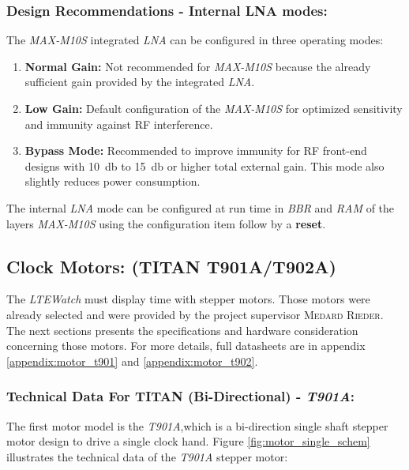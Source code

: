 \documentclass[report.tex]{subfiles}
\begin{document}
\subsubsection{Design Recommendations - Internal LNA modes:}

The \textit{MAX-M10S} integrated \textit{LNA} can be configured in three operating modes:
\begin{enumerate}
\item \textbf{Normal Gain:} Not recommended for \textit{MAX-M10S} because the already sufficient gain provided by the integrated \textit{LNA}.
\item \textbf{Low Gain:} Default configuration of the \textit{MAX-M10S} for optimized sensitivity and immunity against RF interference.
\item \textbf{Bypass Mode:} Recommended to improve immunity for RF front-end designs with \SI{10}{\decibel} to \SI{15}{\decibel} or higher total external gain. This mode also slightly reduces power consumption.\\
\end{enumerate}

\textbf{} The internal \textit{LNA} mode can be configured at run time in \textit{BBR} and \textit{RAM} of the layers \textit{MAX-M10S} using the configuration item  follow by a \textbf{reset}.


\subsection{Clock Motors: (TITAN T901A/T902A)} \label{sec:mot_sel}
The \textit{LTEWatch} must display time with stepper motors. Those motors were already selected and were provided by the project supervisor \textsc{Medard Rieder}. The next sections presents the specifications and hardware consideration concerning those motors. For more details, full datasheets are in appendix \ref{appendix:motor_t901} and \ref{appendix:motor_t902}.  \\[-20pt]
\subsubsection{Technical Data For TITAN (Bi-Directional) - \textit{T901A}:}

The first motor model is the \textit{T901A},which is a bi-direction single shaft stepper motor design to drive a single clock hand. Figure \ref{fig:motor_single_schem} illustrates the technical data of the \textit{T901A} stepper motor: 
\end{document}

